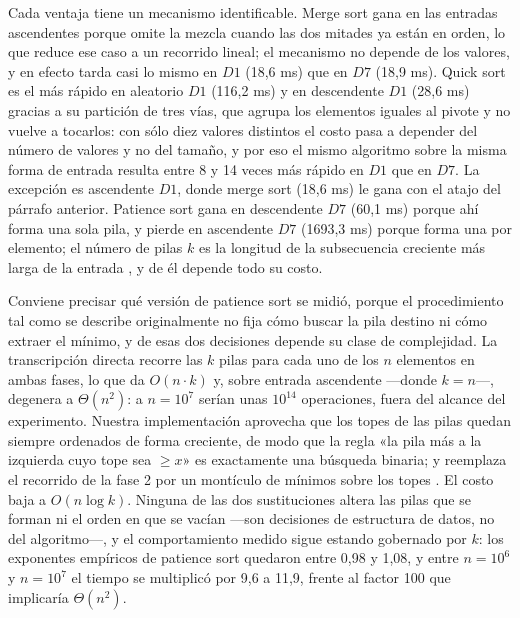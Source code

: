 Cada ventaja tiene un mecanismo identificable. Merge sort gana en las entradas
ascendentes porque omite la mezcla cuando las dos mitades ya están en orden, lo
que reduce ese caso a un recorrido lineal; el mecanismo no depende de los
valores, y en efecto tarda casi lo mismo en $D1$ (18,6 ms) que en $D7$
(18,9 ms). Quick sort es el más rápido en aleatorio $D1$ (116,2 ms) y en
descendente $D1$ (28,6 ms) gracias a su partición de tres vías, que agrupa los
elementos iguales al pivote y no vuelve a tocarlos: con sólo diez valores
distintos el costo pasa a depender del número de valores y no del tamaño, y por
eso el mismo algoritmo sobre la misma forma de entrada resulta entre 8 y 14
veces más rápido en $D1$ que en $D7$. La excepción es ascendente $D1$, donde
merge sort (18,6 ms) le gana con el atajo del párrafo anterior. Patience sort
gana en descendente $D7$ (60,1 ms) porque ahí forma una sola pila, y pierde en
ascendente $D7$ (1693,3 ms) porque forma una por elemento; el número de pilas
$k$ es la longitud de la subsecuencia creciente más larga de la entrada
\cite{aldous1999}, y de él depende todo su costo.

Conviene precisar qué versión de patience sort se midió, porque el
procedimiento tal como se describe originalmente \cite{mallows1963} no fija cómo
buscar la pila destino ni cómo extraer el mínimo, y de esas dos decisiones
depende su clase de complejidad. La transcripción directa recorre las $k$ pilas
para cada uno de los $n$ elementos en ambas fases, lo que da $O(n \cdot k)$ y,
sobre entrada ascendente ---donde $k = n$---, degenera a $\Theta(n^2)$: a
$n = 10^7$ serían unas $10^{14}$ operaciones, fuera del alcance del experimento.
Nuestra implementación aprovecha que los topes de las pilas quedan siempre
ordenados de forma creciente, de modo que la regla «la pila más a la izquierda
cuyo tope sea $\geq x$» es exactamente una búsqueda binaria; y reemplaza el
recorrido de la fase 2 por un montículo de mínimos sobre los topes
\cite{chandramouli2014}. El costo baja a $O(n \log k)$. Ninguna de las dos
sustituciones altera las pilas que se forman ni el orden en que se vacían ---son
decisiones de estructura de datos, no del algoritmo---, y el comportamiento
medido sigue estando gobernado por $k$: los exponentes empíricos de patience
sort quedaron entre 0,98 y 1,08, y entre $n = 10^6$ y $n = 10^7$ el tiempo se
multiplicó por 9,6 a 11,9, frente al factor 100 que implicaría $\Theta(n^2)$.

